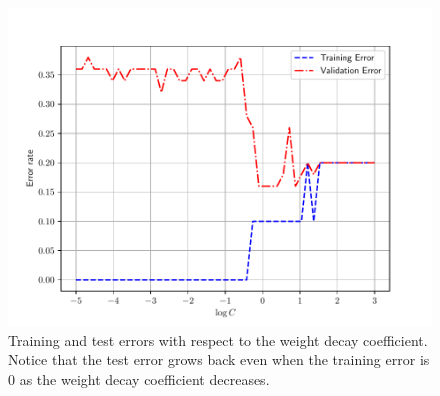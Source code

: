 \documentclass{report}
\begin{document}
\begin{figure}[t]
    \centering
    \begin{minipage}{0.6\textwidth}
        \raggedright
        \includegraphics[width=0.9\columnwidth]{figures/overfit1.pdf}
    \end{minipage}
    \begin{minipage}{0.39\textwidth}
        \raggedleft
        \caption{
            \label{fig:weight_decay}
            Training and test errors with respect to the weight decay
            coefficient. Notice that the test error grows back even when the
            training error is $0$ as the weight decay coefficient decreases.
        }
    \end{minipage}
\end{figure}
\end{document}
